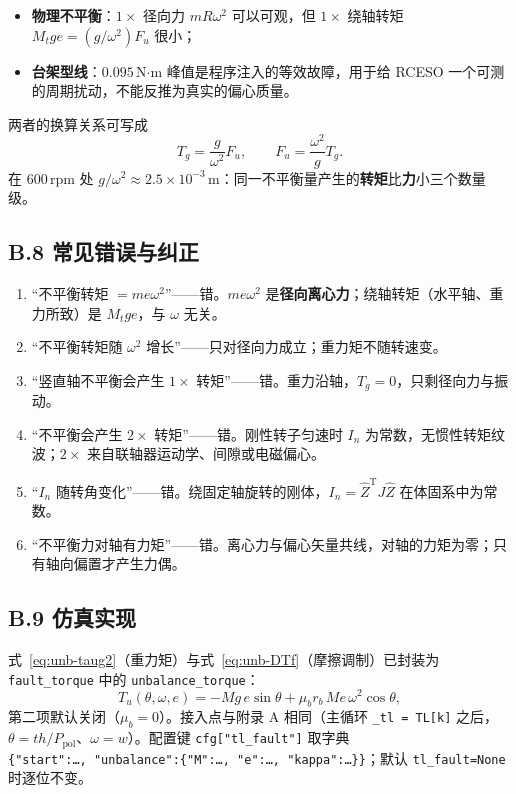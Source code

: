 \begin{itemize}
  \item \textbf{物理不平衡}：$1\times$ 径向力 $mR\omega^2$ 可以可观，但 $1\times$ 绕轴转矩 $M_tge=(g/\omega^2)F_u$ 很小；
  \item \textbf{台架型线}：$0.095$\,N$\cdot$m 峰值是程序注入的等效故障，用于给 RCESO 一个可测的周期扰动，不能反推为真实的偏心质量。
\end{itemize}

两者的换算关系可写成
\begin{equation}
T_g=\frac{g}{\omega^2}F_u,\qquad
F_u=\frac{\omega^2}{g}T_g .
\label{eq:unb-conv}
\end{equation}
在 $600$\,rpm 处 $g/\omega^2\approx2.5\times10^{-3}$\,m：同一不平衡量产生的\textbf{转矩}比\textbf{力}小三个数量级。

\subsection*{B.8 常见错误与纠正}

\begin{enumerate}
  \item “不平衡转矩 $=m e\omega^2$”——错。$m e\omega^2$ 是\textbf{径向离心力}；绕轴转矩（水平轴、重力所致）是 $M_t g e$，与 $\omega$ 无关。
  \item “不平衡转矩随 $\omega^2$ 增长”——只对径向力成立；重力矩不随转速变。
  \item “竖直轴不平衡会产生 $1\times$ 转矩”——错。重力沿轴，$T_g=0$，只剩径向力与振动。
  \item “不平衡会产生 $2\times$ 转矩”——错。刚性转子匀速时 $I_n$ 为常数，无惯性转矩纹波；$2\times$ 来自联轴器运动学、间隙或电磁偏心。
  \item “$I_n$ 随转角变化”——错。绕固定轴旋转的刚体，$I_n=\hat Z^{\mathrm T}J\hat Z$ 在体固系中为常数。
  \item “不平衡力对轴有力矩”——错。离心力与偏心矢量共线，对轴的力矩为零；只有轴向偏置才产生力偶。
\end{enumerate}

\subsection*{B.9 仿真实现}

式~\eqref{eq:unb-taug2}（重力矩）与式~\eqref{eq:unb-DTf}（摩擦调制）已封装为 \texttt{fault\_torque} 中的 \texttt{unbalance\_torque}：
\begin{equation}
T_u(\theta,\omega,e)=-M g\,e\sin\theta+\mu_b r_b\,M e\,\omega^2\cos\theta ,
\label{eq:unb-impl}
\end{equation}
第二项默认关闭（$\mu_b=0$）。接入点与附录 A 相同（主循环 \texttt{\_tl = TL[k]} 之后，$\theta=th/P_{\mathrm{pol}}$、$\omega=w$）。配置键 \texttt{cfg["tl\_fault"]} 取字典 \texttt{\{"start":\ldots,\ "unbalance":\{"M":\ldots,\ "e":\ldots,\ "kappa":\ldots\}\}}；默认 \texttt{tl\_fault=None} 时逐位不变。

